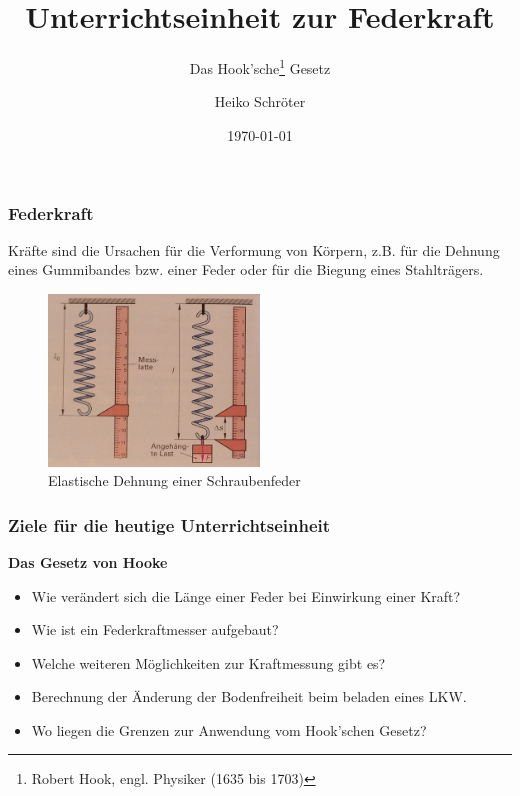 \documentclass{beamer}
\title{Unterrichtseinheit zur Federkraft}
\subtitle{Das Hook'sche\footnote{Robert Hook, engl. Physiker (1635 bis 1703)}  Gesetz}
\author{Heiko Schröter}
\date{\today}
\begin{document}
\frame{\titlepage}

\frame
{
  \frametitle{Federkraft}
  Kräfte sind die Ursachen für die Verformung von Körpern, z.B. für die Dehnung eines Gummibandes bzw. einer Feder oder für die Biegung eines Stahlträgers.
    \begin{figure}
	  \includegraphics[width=0.5\textwidth]{Federkraft.jpg}
	  \vspace{-3mm}
	  \caption{Elastische Dehnung einer Schraubenfeder}
   \end{figure}  
}

\frame
{
  \frametitle{Ziele für die heutige Unterrichtseinheit}
  \textbf{Das Gesetz von Hooke}
  \begin{itemize}
	\item Wie verändert sich die Länge einer Feder bei Einwirkung einer Kraft?
	\item Wie ist ein Federkraftmesser aufgebaut?
	\item Welche weiteren Möglichkeiten zur Kraftmessung gibt es?
	\item Berechnung der Änderung der Bodenfreiheit beim beladen eines LKW.
	\item Wo liegen die Grenzen zur Anwendung vom Hook'schen Gesetz?
  \end{itemize}
}

\end{document}
